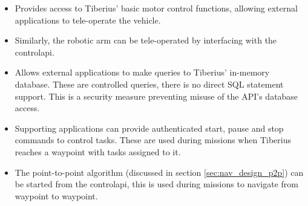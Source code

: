 \begin{itemize}
\item Provides access to Tiberius' basic motor control functions, allowing external applications to tele-operate the vehicle.

\item Similarly, the robotic arm can be tele-operated by interfacing with the \gls{controlapi}.

\item Allows external applications to make queries to Tiberius' in-memory database. These are controlled queries, there is no direct SQL statement support. This is a security measure preventing misuse of the API's database access.

\item Supporting applications can provide authenticated start, pause and stop commands to control tasks. These are used during missions when Tiberius reaches a waypoint with tasks assigned to it.

\item The point-to-point algorithm (discussed in section \ref{sec:nav_design_p2p}) can be started from the \gls{controlapi}, this is used during missions to navigate from waypoint to waypoint.

\end{itemize}

